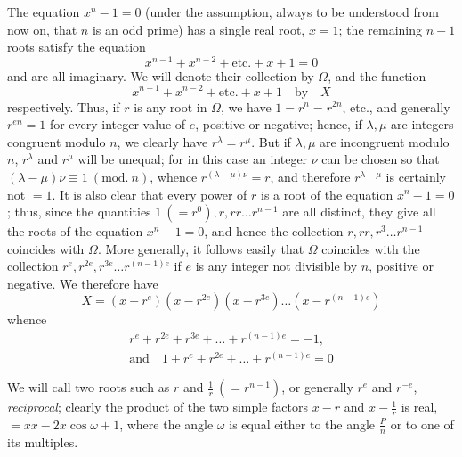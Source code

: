 The equation \(x^n-1=0\) (under the assumption, always to be understood from now on, that \(n\) is an odd prime) has a single real root, \(x=1\); the remaining \(n-1\) roots satisfy the equation \[x^{n-1}+x^{n-2}+\mathrm{etc.}+x+1=0\] and are all imaginary. We will denote their collection by \(\Omega\), and the function \[x^{n-1}+x^{n-2}+\mathrm{etc.}+x+1\quad\text{by}\quad X\]
respectively. Thus, if \(r\) is any root in \(\Omega\), we have \(1=r^n=r^{2n}\), etc., and generally \(r^{en}=1\) for every integer value of \(e\), positive or negative; hence, if \(\lambda,\allowbreak \mu\) are integers congruent modulo \(n\), we clearly have \(r^\lambda=r^\mu\). But if \(\lambda,\allowbreak \mu\) are incongruent modulo \(n\), \(r^\lambda\) and \(r^\mu\) will be unequal; for in this case an integer \(\nu\) can be chosen so that \((\lambda-\mu)\nu\equiv1\ (\mathrm{mod.}\ n)\), whence \(r^{(\lambda-\mu)\nu}=r\), and therefore \(r^{\lambda-\mu}\) is certainly not \(=1\). It is also clear that every power of \(r\) is a root of the equation \(x^n-1=0\); thus, since the quantities \(1\ (=r^0),\allowbreak r,\allowbreak rr\ldots r^{n-1}\) are all distinct, they give all the roots of the equation \(x^n-1=0\), and hence the collection \(r,\allowbreak rr,\allowbreak r^3\ldots r^{n-1}\) coincides with \(\Omega\). More generally, it follows easily that \(\Omega\) coincides with the collection \(r^e,\allowbreak r^{2e},\allowbreak r^{3e}\ldots r^{(n-1)e}\) if \(e\) is any integer not divisible by \(n\), positive or negative. We therefore have \[X=(x-r^e)(x-r^{2e})(x-r^{3e})\ldots(x-r^{(n-1)e})\] whence \[\begin{gathered}
r^e+r^{2e}+r^{3e}+\ldots+r^{(n-1)e}=-1,\\
\text{and}\quad1+r^e+r^{2e}+\ldots+r^{(n-1)e}=0
\end{gathered}\]

We will call two roots such as \(r\) and \(\frac1r\ (=r^{n-1})\), or generally \(r^e\) and \(r^{-e}\), \textit{reciprocal}; clearly the product of the two simple factors \(x-r\) and \(x-\frac1r\) is real, \(=xx-2x\cos\omega+1\), where the angle \(\omega\) is equal either to the angle \(\frac Pn\) or to one of its multiples.

